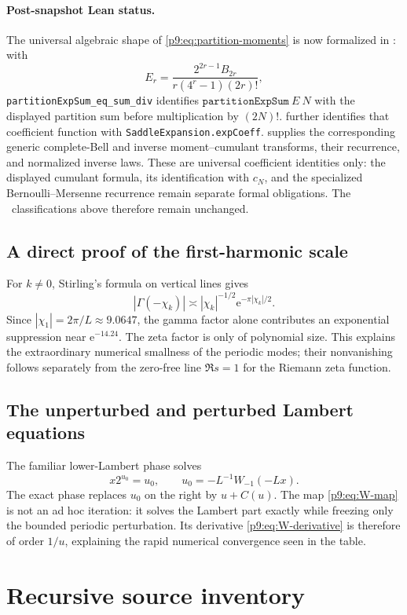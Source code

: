 \documentclass[11pt]{article}
\numberwithin{equation}{section}
\theoremstyle{definition}
\theoremstyle{remark}
\newcommand{\e}{\mathrm e}
\begin{document}
\paragraph{Post-snapshot Lean status.}
The universal algebraic shape of \eqref{p9:eq:partition-moments} is now
formalized in : with
\[
 E_r=\frac{2^{2r-1}B_{2r}}{r(4^r-1)(2r)!},
\]
\nolinkurl{partitionExpSum_eq_sum_div} identifies
\(\texttt{partitionExpSum}\ E\ N\) with the displayed partition sum
before multiplication by \((2N)!\).
 further identifies that coefficient
function with \nolinkurl{SaddleExpansion.expCoeff}.
 supplies the corresponding generic
complete-Bell and inverse moment--cumulant transforms, their recurrence,
and normalized inverse laws.  These are universal coefficient identities
only: the displayed cumulant formula, its identification with \(c_N\),
and the specialized Bernoulli--Mersenne recurrence remain separate formal
obligations.  The \statusN\ classifications above therefore remain unchanged.

\subsection{A direct proof of the first-harmonic scale}
For $k\ne0$, Stirling's formula on vertical lines gives
\[
 |\Gamma(-\chi_k)|\asymp |\chi_k|^{-1/2}\e^{-\pi|\chi_k|/2}.
\]
Since $|\chi_1|=2\pi/L\approx9.0647$, the gamma factor alone contributes an exponential
suppression near $\e^{-14.24}$.  The zeta factor is only of polynomial size.  This explains
the extraordinary numerical smallness of the periodic modes; their nonvanishing follows
separately from the zero-free line $\Re s=1$ for the Riemann zeta function.

\subsection{The unperturbed and perturbed Lambert equations}
The familiar lower-Lambert phase solves
\[
 x2^{u_0}=u_0,
 \qquad
 u_0=-L^{-1}W_{-1}(-Lx).
\]
The exact phase replaces $u_0$ on the right by $u+C(u)$.  The map
\eqref{p9:eq:W-map} is not an ad hoc iteration: it solves the Lambert part exactly while
freezing only the bounded periodic perturbation.  Its derivative
\eqref{p9:eq:W-derivative} is therefore of order $1/u$, explaining the rapid numerical
convergence seen in the table.

\section{Recursive source inventory}
\label{p9:app:inventory}
\end{document}

